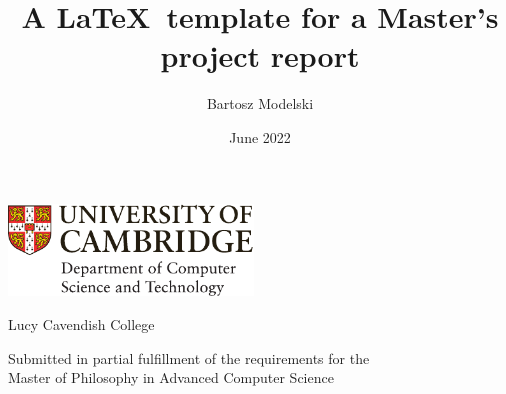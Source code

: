 \documentclass[12pt,a4paper,twoside]{report}
\title{A \LaTeX\ template for a Master's project report}
\author{Bartosz Modelski}
\date{June 2022}
\newif\ifsubmission %
\newcommand{\candidatenumber}{1234N}
\newcommand{\college}{Lucy Cavendish College}
\newcommand{\course}{Master of Philosophy in Advanced Computer Science}
\begin{document}
\begin{sffamily} %

\begin{titlepage}
\makeatletter

\hspace*{-14mm}\includegraphics[width=65mm]{logo-dcst-colour}

\ifsubmission

\begin{Large}
\vspace{20mm}
Research project report title page

\vspace{35mm}
Candidate \candidatenumber

\vspace{42mm}
\textsl{``\@title''}

\end{Large}

\else

\begin{center}
\Huge
\vspace{\fill}

\@title
\vspace{\fill}

\@author
\vspace{10mm}

\Large
\college
\vspace{\fill}

\@date
\vspace{\fill}

\end{center}

\fi

\vspace{\fill}
\begin{center}
Submitted in partial fulfillment of the requirements for the\\
\course
\end{center}

\makeatother
\end{titlepage}

\newpage


\end{sffamily}
\end{document}
